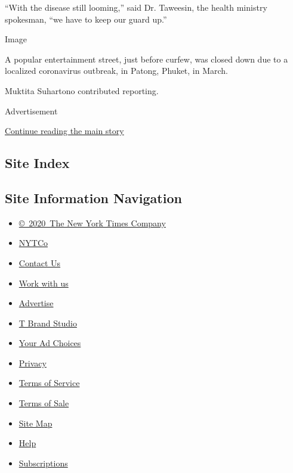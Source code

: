 ``With the disease still looming,'' said Dr. Taweesin, the health
ministry spokesman, ``we have to keep our guard up.''

Image

A popular entertainment street, just before curfew, was closed down due
to a localized coronavirus outbreak, in Patong, Phuket, in March.

Muktita Suhartono contributed reporting.

Advertisement

\protect\hyperlink{after-bottom}{Continue reading the main story}

\hypertarget{site-index}{%
\subsection{Site Index}\label{site-index}}

\hypertarget{site-information-navigation}{%
\subsection{Site Information
Navigation}\label{site-information-navigation}}

\begin{itemize}
\tightlist
\item
  \href{https://help.nytimes.com/hc/en-us/articles/115014792127-Copyright-notice}{©~2020~The
  New York Times Company}
\end{itemize}

\begin{itemize}
\tightlist
\item
  \href{https://www.nytco.com/}{NYTCo}
\item
  \href{https://help.nytimes.com/hc/en-us/articles/115015385887-Contact-Us}{Contact
  Us}
\item
  \href{https://www.nytco.com/careers/}{Work with us}
\item
  \href{https://nytmediakit.com/}{Advertise}
\item
  \href{http://www.tbrandstudio.com/}{T Brand Studio}
\item
  \href{https://www.nytimes.com/privacy/cookie-policy\#how-do-i-manage-trackers}{Your
  Ad Choices}
\item
  \href{https://www.nytimes.com/privacy}{Privacy}
\item
  \href{https://help.nytimes.com/hc/en-us/articles/115014893428-Terms-of-service}{Terms
  of Service}
\item
  \href{https://help.nytimes.com/hc/en-us/articles/115014893968-Terms-of-sale}{Terms
  of Sale}
\item
  \href{https://spiderbites.nytimes.com}{Site Map}
\item
  \href{https://help.nytimes.com/hc/en-us}{Help}
\item
  \href{https://www.nytimes.com/subscription?campaignId=37WXW}{Subscriptions}
\end{itemize}
